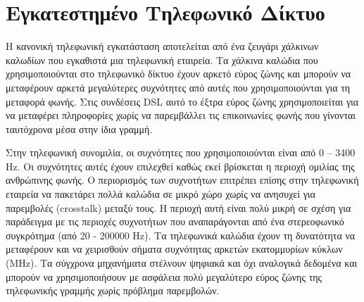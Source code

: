 %
%
\setcounter{section}{0}
\section{Εγκατεστημένο Τηλεφωνικό Δίκτυο}

Η κανονική τηλεφωνική εγκατάσταση αποτελείται από ένα ζευγάρι χάλκινων καλωδίων που εγκαθιστά  μια τηλεφωνική εταιρεία. Τα χάλκινα καλώδια που χρησιμοποιούνται στο τηλεφωνικό δίκτυο έχουν αρκετό εύρος ζώνης και μπορούν να μεταφέρουν αρκετά μεγαλύτερες συχνότητες από αυτές που χρησιμοποιούνται για τη μεταφορά φωνής. Στις συνδέσεις DSL αυτό το έξτρα εύρος ζώνης χρησιμοποιείται για να μεταφέρει πληροφορίες χωρίς να παρεμβάλλει τις επικοινωνίες φωνής που γίνονται ταυτόχρονα μέσα στην ίδια γραμμή.

Στην τηλεφωνική συνομιλία, οι συχνότητες που χρησιμοποιούνται είναι από 0 -- 3400 Hz. Οι συχνότητες αυτές έχουν επιλεχθεί καθώς εκεί βρίσκεται η περιοχή ομιλίας της ανθρώπινης φωνής. O περιορισμός των συχνοτήτων επιτρέπει επίσης στην τηλεφωνική εταιρεία να πακετάρει πολλά καλώδια σε μικρό χώρο χωρίς να ανησυχεί για παρεμβολές (crosstalk) μεταξύ τους. Η περιοχή αυτή είναι πολύ μικρή σε σχέση για παράδειγμα με τις περιοχές συχνοτήτων που αναπαράγονται από ένα στερεοφωνικό συγκρότημα (από 20 - 200000 Hz).  Τα τηλεφωνικά καλώδια έχουν τη δυνατότητα να μεταφέρουν και να χειρισθούν σήματα συχνότητας αρκετών εκατομμυρίων κύκλων (MHz).  Τα σύγχρονα μηχανήματα στέλνουν ψηφιακά και όχι αναλογικά δεδομένα και μπορούν να χρησιμοποιήσουν με ασφάλεια πολύ μεγαλύτερο εύρος ζώνης της τηλεφωνικής γραμμής χωρίς πρόβλημα παρεμβολών.